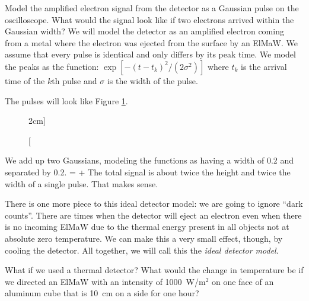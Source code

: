 \begin{example}
\label{ex:twogauss}
Model the amplified electron signal from the detector as a Gaussian pulse on the oscilloscope. What would the signal look like if two electrons arrived within the Gaussian width?
\model We will model the detector as an amplified electron coming from a metal where the electron was ejected from the surface by an ElMaW. We assume that every pulse is identical and only differs by its peak time. We model the peaks as the function: $\exp[-(t-t_k)^2/(2\sigma^2)]$ where $t_k$ is the arrival time of the $k$th pulse and $\sigma$ is the width of the pulse.

\vis The pulses will look like Figure \ref{fig:twogaussfig}.
\begin{figure}
\centering
{}
\caption[][2cm]{ }
\label{fig:twogaussfig}
\end{figure}

\sol We add up two Gaussians, modeling the functions as having a width of 0.2 and separated by 0.2.
\beq
{}= \exp[-(t-0.5)^2/(2(0.2^2)] + \exp[-(t-0.7)^2/(2(0.2^2)]
\eeq
\assess The total signal is about twice the height and twice the width of a single pulse. That makes sense.
\end{example}

There is one more piece to this ideal detector model: we are going to ignore ``dark counts''. There are times when the detector will eject an electron even when there is no incoming ElMaW due to the thermal energy present in all objects not at absolute zero temperature. We can make this a very small effect, though, by cooling the detector. All together, we will call this the {\em ideal detector model}.


\begin{exercise}
What if we used a thermal detector? What would the change in temperature be if we directed an ElMaW with an intensity of 1000~W/m$^2$ on one face of an aluminum cube that is 10~cm on a side for one hour?
\end{exercise}


